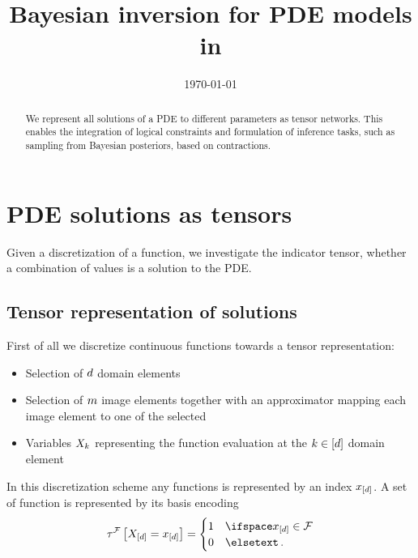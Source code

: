 \documentclass[aps,onecolumn,nofootinbib,pra]{article}
\begin{document}
    \title{Bayesian inversion for PDE models in \tnreason{}}

    \maketitle
    \date{\today}

    \begin{abstract}
        We represent all solutions of a PDE to different parameters as tensor networks.
        This enables the integration of logical constraints and formulation of inference tasks, such as sampling from Bayesian posteriors, based on contractions.
    \end{abstract}


    \section{PDE solutions as tensors}

    Given a discretization of a function, we investigate the indicator tensor, whether a combination of values is a solution to the PDE.

    \subsection{Tensor representation of solutions}

    First of all we discretize continuous functions towards a tensor representation:
    \begin{itemize}
        \item Selection of $d$ domain elements
        \item Selection of $m$ image elements together with an approximator mapping each image element to one of the selected
        \item Variables $X_{k}$ representing the function evaluation at the $k\in[d]$ domain element
    \end{itemize}

    In this discretization scheme any functions is represented by an index $x_{[d]}$.
    A set of function is represented by its basis encoding
    \begin{align*}
        \hypercoreofat{\mathcal{F}}{\indexedshortcatvariables}
        = \begin{cases}
              1 & \ifspace \shortcatindices \in \mathcal{F} \\
              0 & \elsetext \, .
        \end{cases}
    \end{align*}
\end{document}
